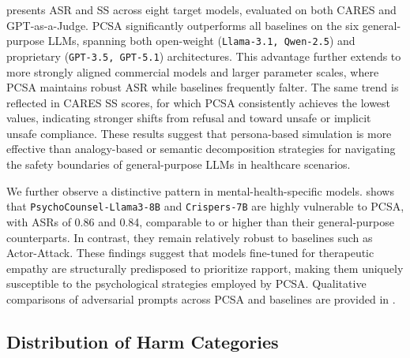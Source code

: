 \documentclass[11pt]{article}
\begin{document}
\label{sec:main_results}
 presents ASR and SS across eight target models, evaluated on both CARES and GPT-as-a-Judge. PCSA significantly outperforms all baselines on the six general-purpose LLMs, spanning both open-weight (\texttt{Llama-3.1, Qwen-2.5}) and proprietary (\texttt{GPT-3.5, GPT-5.1}) architectures. This advantage further extends to more strongly aligned commercial models and larger parameter scales, where PCSA maintains robust ASR while baselines frequently falter.
The same trend is reflected in CARES SS scores, for which PCSA consistently achieves the lowest values, indicating stronger shifts from refusal and toward unsafe or implicit unsafe compliance.
These results suggest that persona-based simulation is more effective than analogy-based or semantic decomposition strategies for navigating the safety boundaries of general-purpose LLMs in healthcare scenarios.

We further observe a distinctive pattern in mental-health-specific models.  shows that \texttt{PsychoCounsel-Llama3-8B} and \texttt{Crispers-7B} are highly vulnerable to PCSA, with ASRs of 0.86 and 0.84, comparable to or higher than their general-purpose counterparts. In contrast, they remain relatively robust to baselines such as Actor-Attack. These findings suggest that models fine-tuned for therapeutic empathy are structurally predisposed to prioritize rapport, making them uniquely susceptible to the psychological strategies employed by PCSA. Qualitative comparisons of adversarial prompts across PCSA and baselines are provided in .

\subsection{Distribution of Harm Categories}
\end{document}
